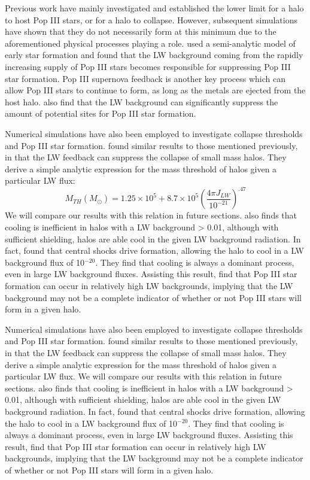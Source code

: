 \documentclass[a4paper,fleqn,usenatbib]{mnras}
\begin{document}
Previous work have mainly investigated and established the lower limit for a halo to host Pop III stars, or for a halo to collapse. However, subsequent simulations have shown that they do not necessarily form at this minimum due to the aforementioned physical processes playing a role. \citet{Mebane18} used a semi-analytic model of early star formation and found that the LW background coming from the rapidly increasing supply of Pop III stars becomes responsible for suppressing Pop III star formation. Pop III supernova feedback is another key process which can allow Pop III stars to continue to form, as long as the metals are ejected from the host halo. \citet{Griffen18} also find that the LW background can significantly suppress the amount of potential sites for Pop III star formation. 

Numerical simulations have also been employed to investigate collapse thresholds and Pop III star formation. \citet[hereafter M01]{Machacek01} found similar results to those mentioned previously, in that the LW feedback can suppress the collapse of small mass halos. They derive a simple analytic expression for the mass threshold of halos given a particular LW flux:
\begin{equation} \label{mthresh}
	M_{TH} ( M_{\odot} ) = 1.25 \times 10^{5} + 8.7  \times 10^{5} \left( \frac{4 \pi J_{LW}}{10^{-21}} \right)^{.47}
\end{equation}
We will compare our results with this relation in future sections. \citet{Yoshida03} also finds that cooling is inefficient in halos with a LW background > 0.01, although with sufficient \hh{} shielding, halos are able cool in the given LW background radiation. In fact, \citet{Wise07_UVB} found that central shocks drive \hh{} formation, allowing the halo to cool in a LW background flux of 10$^{-20}$. They find that \hh{} cooling is always a dominant process, even in large LW background fluxes. Assisting this result, \citet{OShea08} find that Pop III star formation can occur in relatively high LW backgrounds, implying that the LW background may not be a complete indicator of whether or not Pop III stars will form in a given halo.  

Numerical simulations have also been employed to investigate collapse thresholds and Pop III star formation. \citet{Machacek01} found similar results to those mentioned previously, in that the LW feedback can suppress the collapse of small mass halos. They derive a simple analytic expression for the mass threshold of halos given a particular LW flux. We will compare our results with this relation in future sections. \citet{Yoshida03} also finds that cooling is inefficient in halos with a LW background > 0.01, although with sufficient \hh{} shielding, halos are able cool in the given LW background radiation. In fact, \citet{Wise07_UVB} found that central shocks drive \hh{} formation, allowing the halo to cool in a LW background flux of 10$^{-20}$. They find that \hh{} cooling is always a dominant process, even in large LW background fluxes. Assisting this result, \citet{OShea08} find that Pop III star formation can occur in relatively high LW backgrounds, implying that the LW background may not be a complete indicator of whether or not Pop III stars will form in a given halo.  
\end{document}
